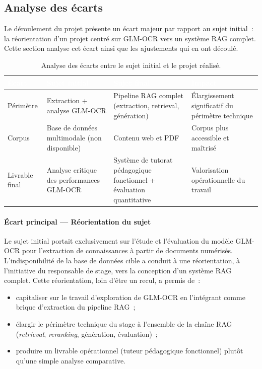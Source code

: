 \documentclass[11pt,a4paper]{article}
\begin{document}
\subsection{Analyse des écarts}
\label{sec:ecarts}

Le déroulement du projet présente un écart majeur par rapport au sujet initial~: la réorientation d'un projet centré sur GLM-OCR vers un système RAG complet. Cette section analyse cet écart ainsi que les ajustements qui en ont découlé.

\begin{table}[H]
\centering
\begin{tabularx}{\linewidth}{L{3.2cm} L{3cm} L{3cm} L{3.2cm}}
\toprule
{}
\textcolor{white}{\textbf{Écart}} &
\textcolor{white}{\textbf{Sujet initial}} &
\textcolor{white}{\textbf{Sujet final}} &
\textcolor{white}{\textbf{Impact}} \\
\midrule
Périmètre        & Extraction + analyse GLM-OCR & Pipeline RAG complet (extraction, retrieval, génération) & Élargissement significatif du périmètre technique \\
Corpus            & Base de données multimodale (non disponible) & Contenu web et PDF & Corpus plus accessible et maîtrisé \\
Livrable final    & Analyse critique des performances GLM-OCR & Système de tutorat pédagogique fonctionnel + évaluation quantitative & Valorisation opérationnelle du travail \\
\bottomrule
\end{tabularx}
\caption{Analyse des écarts entre le sujet initial et le projet réalisé.}
\label{tab:ecarts}
\end{table}

\paragraph{Écart principal --- Réorientation du sujet}

Le sujet initial portait exclusivement sur l'étude et l'évaluation du modèle GLM-OCR pour l'extraction de connaissances à partir de documents numérisés. L'indisponibilité de la base de données cible a conduit à une réorientation, à l'initiative du responsable de stage, vers la conception d'un système RAG complet. Cette réorientation, loin d'être un recul, a permis de~:
\begin{itemize}
  \item capitaliser sur le travail d'exploration de GLM-OCR en l'intégrant comme brique d'extraction du pipeline RAG~;
  \item élargir le périmètre technique du stage à l'ensemble de la chaîne RAG (\textit{retrieval}, \textit{reranking}, génération, évaluation)~;
  \item produire un livrable opérationnel (tuteur pédagogique fonctionnel) plutôt qu'une simple analyse comparative.
\end{itemize}
\end{document}

